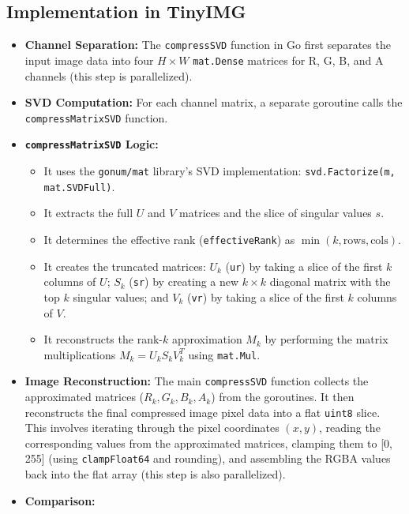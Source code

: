 \documentclass{article}
\begin{document}
\subsection{Implementation in TinyIMG}
\begin{itemize}
    \item \textbf{Channel Separation:} The \texttt{compressSVD} function in Go first separates the input image data into four $H \times W$ \texttt{mat.Dense} matrices for R, G, B, and A channels (this step is parallelized).
    \item \textbf{SVD Computation:} For each channel matrix, a separate goroutine calls the \texttt{compressMatrixSVD} function.
    \item \textbf{\texttt{compressMatrixSVD} Logic:}
        \begin{itemize}
            \item It uses the \texttt{gonum/mat} library's SVD implementation: \texttt{svd.Factorize(m, mat.SVDFull)}.
            \item It extracts the full $U$ and $V$ matrices and the slice of singular values $s$.
            \item It determines the effective rank (\texttt{effectiveRank}) as $\min(k, \text{rows}, \text{cols})$.
            \item It creates the truncated matrices: $U_k$ (\texttt{ur}) by taking a slice of the first $k$ columns of $U$; $S_k$ (\texttt{sr}) by creating a new $k \times k$ diagonal matrix with the top $k$ singular values; and $V_k$ (\texttt{vr}) by taking a slice of the first $k$ columns of $V$.
            \item It reconstructs the rank-$k$ approximation $M_k$ by performing the matrix multiplications $M_k = U_k S_k V_k^T$ using \texttt{mat.Mul}.
        \end{itemize}
    \item \textbf{Image Reconstruction:} The main \texttt{compressSVD} function collects the approximated matrices ($R_k, G_k, B_k, A_k$) from the goroutines. It then reconstructs the final compressed image pixel data into a flat \texttt{uint8} slice. This involves iterating through the pixel coordinates $(x, y)$, reading the corresponding values from the approximated matrices, clamping them to [0, 255] (using \texttt{clampFloat64} and rounding), and assembling the RGBA values back into the flat array (this step is also parallelized).
    \item \textbf{Comparison:}
        \begin{figure}[H]

\end{figure}
\end{itemize}
\end{document}
